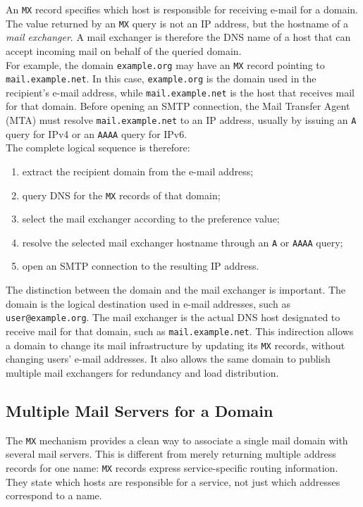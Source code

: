 \documentclass{scrbook}
\begin{document}
	An \texttt{MX} record specifies which host is responsible for receiving e-mail for a domain. The value returned by an \texttt{MX} query is not an IP address, but the hostname of a \emph{mail exchanger}. A mail exchanger is therefore the DNS name of a host that can accept incoming mail on behalf of the queried domain.\\
	
	For example, the domain \texttt{example.org} may have an \texttt{MX} record pointing to \texttt{mail.example.net}. In this case, \texttt{example.org} is the domain used in the recipient's e-mail address, while \texttt{mail.example.net} is the host that receives mail for that domain. Before opening an SMTP connection, the Mail Transfer Agent (MTA) must resolve \texttt{mail.example.net} to an IP address, usually by issuing an \texttt{A} query for IPv4 or an \texttt{AAAA} query for IPv6.\\
	
	The complete logical sequence is therefore:
	\begin{enumerate}
		\item extract the recipient domain from the e-mail address;
		\item query DNS for the \texttt{MX} records of that domain;
		\item select the mail exchanger according to the preference value;
		\item resolve the selected mail exchanger hostname through an \texttt{A} or \texttt{AAAA} query;
		\item open an SMTP connection to the resulting IP address.
	\end{enumerate}
	
	The distinction between the domain and the mail exchanger is important. The domain is the logical destination used in e-mail addresses, such as \texttt{user@example.org}. The mail exchanger is the actual DNS host designated to receive mail for that domain, such as \texttt{mail.example.net}. This indirection allows a domain to change its mail infrastructure by updating its \texttt{MX} records, without changing users' e-mail addresses. It also allows the same domain to publish multiple mail exchangers for redundancy and load distribution.
	
	\subsection{Multiple Mail Servers for a Domain}
	
	The \texttt{MX} mechanism provides a clean way to associate a single mail domain with several mail servers. This is different from merely returning multiple address records for one name: \texttt{MX} records express service-specific routing information. They state which hosts are responsible for a service, not just which addresses correspond to a name.\\
	
\end{document}
